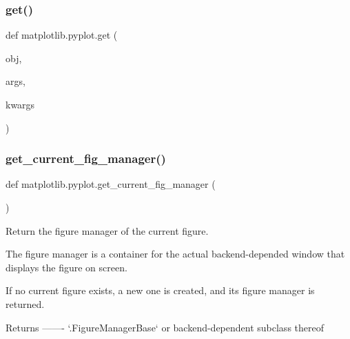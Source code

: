 \mbox{\label{namespacematplotlib_1_1pyplot_ae426592d9ea324ce6c0ded568f349492}} 
\subsubsection{\texorpdfstring{get()}{get()}}
{\footnotesize\ttfamily def matplotlib.\+pyplot.\+get (\begin{DoxyParamCaption}\item[{}]{obj,  }\item[{}]{args,  }\item[{}]{kwargs }\end{DoxyParamCaption})}

\mbox{\label{namespacematplotlib_1_1pyplot_ac6d35057e0a407371c0a0ddd8048da89}} 
\subsubsection{\texorpdfstring{get\+\_\+current\+\_\+fig\+\_\+manager()}{get\_current\_fig\_manager()}}
{\footnotesize\ttfamily def matplotlib.\+pyplot.\+get\+\_\+current\+\_\+fig\+\_\+manager (\begin{DoxyParamCaption}{ }\end{DoxyParamCaption})}

\begin{DoxyVerb}Return the figure manager of the current figure.

The figure manager is a container for the actual backend-depended window
that displays the figure on screen.

If no current figure exists, a new one is created, and its figure
manager is returned.

Returns
-------
`.FigureManagerBase` or backend-dependent subclass thereof
\end{DoxyVerb}
 \mbox{\label{namespacematplotlib_1_1pyplot_a8a01efa66eeded35b31c5b6e30e0a5e5}} 
